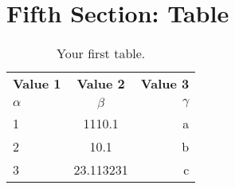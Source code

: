 \documentclass{article}
\begin{document}
\section{Fifth Section: Table}
\begin{table}[h!]
  \begin{center}
    \caption{Your first table.}
    \label{tab:table1}
    \begin{tabular}{l|c|r} %
      \textbf{Value 1} & \textbf{Value 2} & \textbf{Value 3}\\
      $\alpha$ & $\beta$ & $\gamma$ \\
      \hline
      1 & 1110.1 & a\\
      2 & 10.1 & b\\
      3 & 23.113231 & c\\
    \end{tabular}
  \end{center}
\end{table}
 
 
\end{document}
